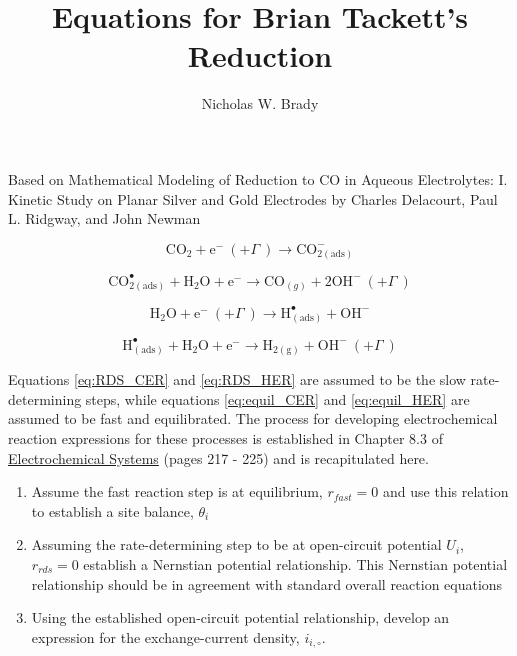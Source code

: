 \documentclass[12pt]{article}
\title{Equations for Brian Tackett's \ch{CO2} Reduction}
\author[1]{Nicholas W. Brady}
\affil[1]{University of Hasselt, Hasselt 3500, Belgium}
\begin{document}
	\maketitle

	\clearpage

  Based on Mathematical Modeling of  Reduction to CO in Aqueous Electrolytes: I. Kinetic Study on Planar Silver and Gold Electrodes by Charles Delacourt, Paul L. Ridgway, and John Newman

  \begin{equation} \label{eq:RDS_CER}
    \text{CO}_2 + \text{e}^- \ (+ \Gamma \ ) \rightarrow \text{CO}^-_{2(\text{ads})}
  \end{equation}

  \begin{equation} \label{eq:equil_CER}
    \text{CO}_{2(\text{ads})}^{\bullet} + \text{H}_2\text{O} + \text{e}^- \rightarrow \text{CO}_{(g)} + 2\text{OH}^- \ (+ \Gamma \ )
  \end{equation}

  \begin{equation} \label{eq:RDS_HER}
    \text{H}_2\text{O} + \text{e}^- \ (+ \Gamma \ ) \rightarrow \text{H}^{\bullet}_{(\text{ads})} + \text{OH}^-
  \end{equation}

  \begin{equation} \label{eq:equil_HER}
    \text{H}^{\bullet}_{(\text{ads})} + \text{H}_2\text{O} + \text{e}^- \rightarrow \text{H}_{2(\text{g})} + \text{OH}^- \ (+ \Gamma \ )
  \end{equation}

  Equations \ref{eq:RDS_CER} and \ref{eq:RDS_HER} are assumed to be the slow rate-determining steps, while equations \ref{eq:equil_CER} and \ref{eq:equil_HER} are assumed to be fast and equilibrated. The process for developing electrochemical reaction expressions for these processes is established in Chapter 8.3 of \underline{Electrochemical Systems} (pages 217  - 225) and is recapitulated here.

  \begin{enumerate}
    \item Assume the fast reaction step is at equilibrium, $r_{fast} = 0$ and use this relation to establish a site balance, $\theta_i$
    \item Assuming the rate-determining step to be at open-circuit potential $U_i$, $r_{rds} = 0$ establish a Nernstian potential relationship. This Nernstian potential relationship should be in agreement with standard overall reaction equations
    \item Using the established open-circuit potential relationship, develop an expression for the exchange-current density, $i_{i,\circ}$.
  \end{enumerate}
\end{document}
